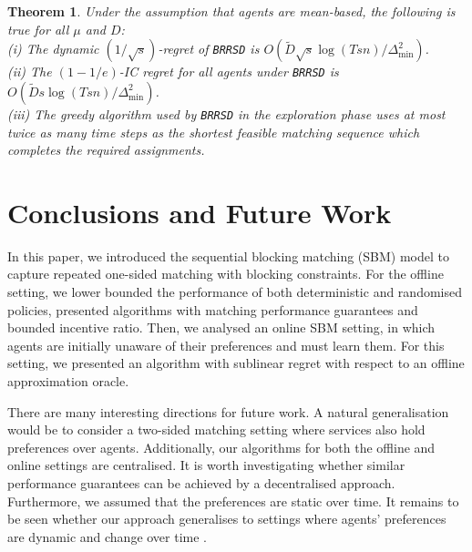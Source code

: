 \documentclass[letterpaper,11pt]{article}
\newtheorem{thm}{Theorem}
\begin{document}
\begin{thm}
\label{thm:bandit}
Under the assumption that agents are mean-based, the following is true for all $\mu$ and $D$: \\
(i) The dynamic $(1/\sqrt{s})$-regret of \texttt{BRRSD} is $O\left(\tilde{D}\sqrt{s}\log\left(Tsn\right)/\Delta^{2}_{\text{min}}\right)$. \\
(ii) The $(1-1/e)$-IC regret for all agents under \texttt{BRRSD} is $O\left(\tilde{D}s\log\left(Tsn\right)/\Delta^{2}_{\text{min}}\right)$. \\
(iii) The greedy algorithm used by \texttt{BRRSD} in the exploration phase uses at most twice as many time steps as the shortest feasible matching sequence which completes the required assignments.
\end{thm}
\section{Conclusions and Future Work}
In this paper, we introduced the sequential blocking matching (SBM) model to capture repeated one-sided matching with blocking constraints. For the offline setting, we lower bounded the performance of both deterministic and randomised policies, presented algorithms with matching performance guarantees and bounded incentive ratio. Then, we analysed an online SBM setting, in which agents are initially unaware of their preferences and must learn them. For this setting, we presented an algorithm with sublinear regret with respect to an offline approximation oracle.

There are many interesting directions for future work. A natural generalisation would be to consider a two-sided matching setting \cite{Roth92} where services also hold preferences over agents. Additionally, our algorithms for both the offline and online settings are centralised. It is worth investigating whether similar performance guarantees can be achieved by a decentralised approach. Furthermore, we assumed that the preferences are static over time. It remains to be seen whether our approach generalises to settings where agents' preferences are dynamic and change over time \cite{BV19}.
\end{document}
